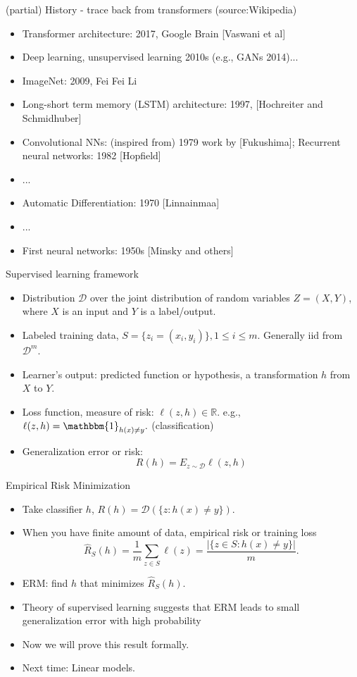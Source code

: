 \documentclass[final]{beamer}
\begin{document}
\begin{frame}{(partial) History - trace back from transformers (source:Wikipedia)}
	\begin{itemize}
		\item Transformer architecture: 2017, Google Brain [Vaswani et al]
		\item Deep learning, unsupervised learning 2010s (e.g., GANs 2014)...
		\item ImageNet: 2009, Fei Fei Li 
		\item Long-short term memory (LSTM) architecture: 1997, [Hochreiter and Schmidhuber]
		\item Convolutional NNs: (inspired from) 1979 work by [Fukushima];  Recurrent neural networks: 1982 [Hopfield]
		\item ...
		\item Automatic Differentiation: 1970 [Linnainmaa]
		\item ...
		\item First neural networks: 1950s [Minsky and others]
	\end{itemize}
\end{frame}
\begin{frame}{Supervised learning framework}
	\begin{itemize}
		\item Distribution $\mathcal{D}$ over the joint distribution of random variables $Z = (X, Y)$, where $X$ is an input and $Y$ is a label/output.
		\pause
	\item Labeled training data, $S = \{z_i = (x_i, y_i)\}, 1\leq i \leq m.$ Generally iid from $\mathcal{D}^m.$
		\pause
		\item Learner's output: predicted function or hypothesis, a transformation $h$ from $X$ to $Y$.
		\pause
	\item Loss function, measure of risk:  $\ell(z, h) \in \mathbb{R}$. e.g., $\ell(z, h) =  \mathbbm{1}_{h(x) \neq y}.$ (classification)
	\pause
	\item Generalization error or risk: 
		$$R(h) = E_{z\sim \mathcal{D}} \ell(z, h)$$
	\end{itemize}
\end{frame}
\begin{frame}{Empirical Risk Minimization}
	\begin{itemize}
		\item Take classifier $h$, $R(h) = \mathcal{D}(\{z: h(x) \neq y\}).$
		\pause
		\item When you have finite amount of data, empirical risk or training loss
		$$ \hat{R}_S(h) = \dfrac{1}{m} \sum_{z \in S} \ell(z) = \dfrac{|\{z \in S: h(x) \neq y\}|}{m}.$$
		\pause
	\item ERM: find $h$ that minimizes $\hat{R}_S(h).$
	\pause
	\item Theory of supervised learning suggests that ERM leads to small generalization error with high probability
	\pause
	\item Now we will prove this result formally. 
	\pause
\item Next time: Linear models.
\end{itemize}
\end{frame}
\end{document}
